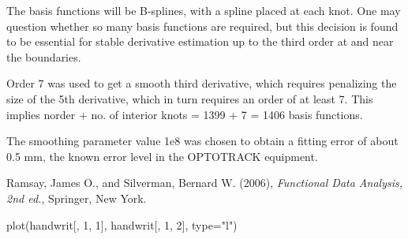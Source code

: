 \documentclass{article}
\begin{document}
\begin{Details}
The basis functions will be B-splines, with a spline placed at each
knot.  One may question whether so many basis functions are required,
but this decision is found to be essential for stable derivative
estimation up to the third order at and near the boundaries.  

Order 7 was used to get a smooth third derivative, which requires
penalizing the size of the 5th derivative, which in turn requires an
order of at least 7.  This implies norder + no. of interior knots =
1399 + 7 = 1406 basis functions.  

The smoothing parameter value 1e8 was chosen to obtain a fitting error
of about 0.5 mm, the known error level in the OPTOTRACK equipment.
\end{Details}
\begin{Source}\relax
Ramsay, James O., and Silverman, Bernard W. (2006), \emph{Functional
Data Analysis, 2nd ed.}, Springer, New York.
\end{Source}
\begin{Examples}
\begin{ExampleCode}
plot(handwrit[, 1, 1], handwrit[, 1, 2], type="l")
\end{ExampleCode}
\end{Examples}
\end{document}
